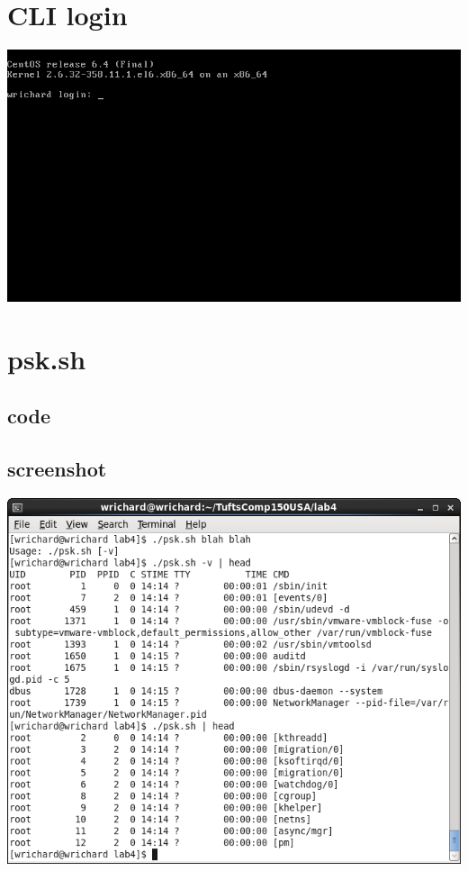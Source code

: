 \documentclass[a4paper,10pt]{article}
\begin{document}
\section{CLI login}
  \begin{center}
  \includegraphics[width=\linewidth]{./cli.png}
  \end{center}

\section{psk.sh}
\subsection{code}

\subsection{screenshot}
  \begin{center}
  \includegraphics[width=\linewidth]{./psk.png}
  \end{center}
\end{document}
